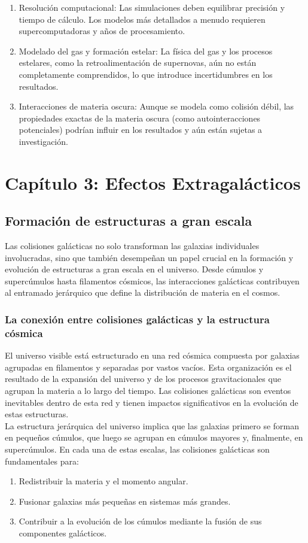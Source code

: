 \documentclass{article}
\begin{document}
\begin{enumerate}
    \item Resolución computacional:
Las simulaciones deben equilibrar precisión y tiempo de cálculo. Los modelos más detallados a menudo requieren supercomputadoras y años de procesamiento.
    \item Modelado del gas y formación estelar:
La física del gas y los procesos estelares, como la retroalimentación de supernovas, aún no están completamente comprendidos, lo que introduce incertidumbres en los resultados.
    \item Interacciones de materia oscura:
Aunque se modela como colisión débil, las propiedades exactas de la materia oscura (como autointeracciones potenciales) podrían influir en los resultados y aún están sujetas a investigación.
\end{enumerate}

\section{Capítulo 3: Efectos Extragalácticos}
\subsection{Formación de estructuras a gran escala}

Las colisiones galácticas no solo transforman las galaxias individuales involucradas, sino que también desempeñan un papel crucial en la formación y evolución de estructuras a gran escala en el universo. Desde cúmulos y supercúmulos hasta filamentos cósmicos, las interacciones galácticas contribuyen al entramado jerárquico que define la distribución de materia en el cosmos.

\subsubsection{La conexión entre colisiones galácticas y la estructura cósmica}
El universo visible está estructurado en una red cósmica compuesta por galaxias agrupadas en filamentos y separadas por vastos vacíos. Esta organización es el resultado de la expansión del universo y de los procesos gravitacionales que agrupan la materia a lo largo del tiempo. Las colisiones galácticas son eventos inevitables dentro de esta red y tienen impactos significativos en la evolución de estas estructuras. \\

La estructura jerárquica del universo implica que las galaxias primero se forman en pequeños cúmulos, que luego se agrupan en cúmulos mayores y, finalmente, en supercúmulos. En cada una de estas escalas, las colisiones galácticas son fundamentales para:
\begin{enumerate}
    \item Redistribuir la materia y el momento angular.
    \item Fusionar galaxias más pequeñas en sistemas más grandes.
    \item Contribuir a la evolución de los cúmulos mediante la fusión de sus componentes galácticos.
\end{enumerate}
\end{document}
